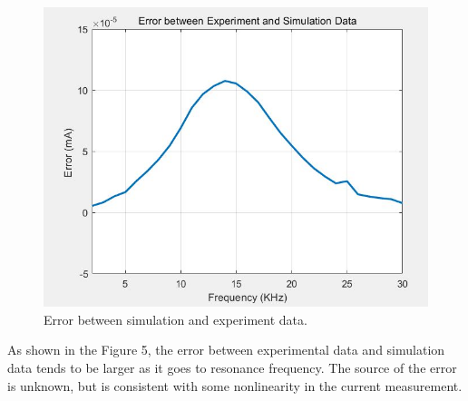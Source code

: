\documentclass[12pt]{article}
\begin{document}
\begin{figure}[htp]
    \centering
    \includegraphics[width= 15cm]{ErrorPlot_Updated.JPG}
    \caption{Error between simulation and experiment data.}
    \label{fig:galaxy}
\end{figure}

As shown in the Figure 5, the error between experimental data and simulation data tends to be larger as it goes to resonance frequency. The source of the error is unknown, but is consistent with some nonlinearity in the current measurement.
\end{document}
